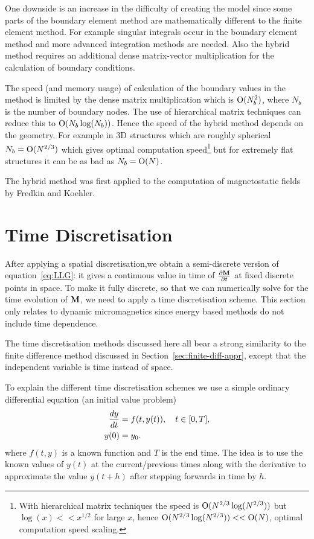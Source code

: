 One downside is an increase in the difficulty of creating the model since some parts of the boundary element method are mathematically different to the finite element method. For example singular integrals occur in the boundary element method and more advanced integration methods are needed. Also the hybrid method requires an additional dense matrix-vector multiplication for the calculation of boundary conditions.

The speed (and memory usage) of calculation of the boundary values in the method is limited by the dense matrix multiplication which is $\text{O}(N_b^2)$, where $N_b$ is the number of boundary nodes. The use of hierarchical matrix techniques can reduce this to $\text{O}(N_b \log(N_b))$.\cite{Knittel2009} Hence the speed of the hybrid method depends on the geometry. For example in 3D structures which are roughly spherical $N_b = \text{O}(N^{2/3})$ which gives optimal computation speed\footnote{With hierarchical matrix techniques the speed is $\text{O}(N^{2/3}\log(N^{2/3}))$ but $\log(x) << x^{1/2}$ for large $x$, hence $\text{O}(N^{2/3}\log(N^{2/3})) << \text{O}(N)$, \ie optimal computation speed scaling.} but for extremely flat structures it can be as bad as $N_b = \text{O}(N)$.

The hybrid method was first applied to the computation of magnetostatic fields by Fredkin and Koehler.\cite{Fredkin1990}


\section{Time Discretisation}
\label{sec:time-discretisation}

After applying a spatial discretisation,we obtain a semi-discrete version of  equation~\eqref{eq:LLG}: it gives a continuous value in time of $\frac{\partial \mathbf{M}}{\partial t}$ at fixed discrete points in space. To make it fully discrete, so that we can numerically solve for the time evolution of $\mathbf{M}$, we need to apply a time discretisation scheme. This section only relates to dynamic micromagnetics since energy based methods do not include time dependence.

The time discretisation methods discussed here all bear a strong similarity to the finite difference method discussed in Section~\ref{sec:finite-diff-appr}, except that the independent variable is time instead of space.

To explain the different time discretisation schemes we use a simple ordinary differential equation (an initial value problem)
\begin{align}
  \frac{dy}{dt} &= f(t,y(t)), \quad t \in [0,T],  \notag \\
  y(0) &= y_0.
  \label{eq:45}
\end{align}
where $f(t,y)$ is a known function and $T$ is the end time. The idea is to use the known values of $y(t)$ at the current/previous times along with the derivative to approximate the value $y(t+h)$  after stepping forwards in time by $h$.

